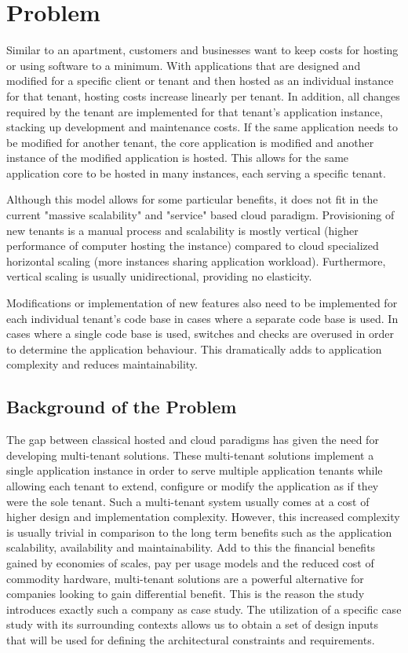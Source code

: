  \section{Problem}
 
Similar to an apartment, customers and businesses want to keep costs for hosting or using software to a minimum. With applications that are designed and modified for a specific client or tenant and then hosted as an individual instance for that tenant, hosting costs increase linearly per tenant. In addition, all changes required by the tenant are implemented for that tenant's application instance, stacking up development and maintenance costs. If the same application needs to be modified for another tenant, the core application is modified and another instance of the modified application is hosted. This allows for the same application core to be hosted in many instances, each serving a specific tenant. 

Although this model allows for some particular benefits, it does not fit in the current "massive scalability" and "service" based cloud paradigm. Provisioning of new tenants is a manual process and scalability is mostly vertical (higher performance of computer hosting the instance) compared to cloud specialized horizontal scaling (more instances sharing application workload). Furthermore, vertical scaling is usually unidirectional, providing no elasticity. 

Modifications or implementation of new features also need to be implemented for each individual tenant's code base in cases where a separate code base is used. In cases where a single code base is used, switches and checks are overused in order to determine the application behaviour. This dramatically adds to application complexity and reduces maintainability.

\subsection{Background of the Problem}
The gap between classical hosted and cloud paradigms has given the need for developing multi-tenant solutions. These multi-tenant solutions implement a single application instance in order to serve multiple application tenants while allowing each tenant to extend, configure or modify the application as if they were the sole tenant. Such a multi-tenant system usually comes at a cost of higher design and implementation complexity. However, this increased complexity is usually trivial in comparison to the long term benefits such as the application scalability, availability  and maintainability. Add to this the financial benefits gained by economies of scales, pay per usage models and the reduced cost of commodity hardware, multi-tenant solutions are a powerful alternative for companies looking to gain differential benefit. This is the reason the study introduces exactly such a company as case study. The utilization of a specific case study with its surrounding contexts allows us to obtain a set of design inputs that will be used for defining the architectural constraints and requirements. 

